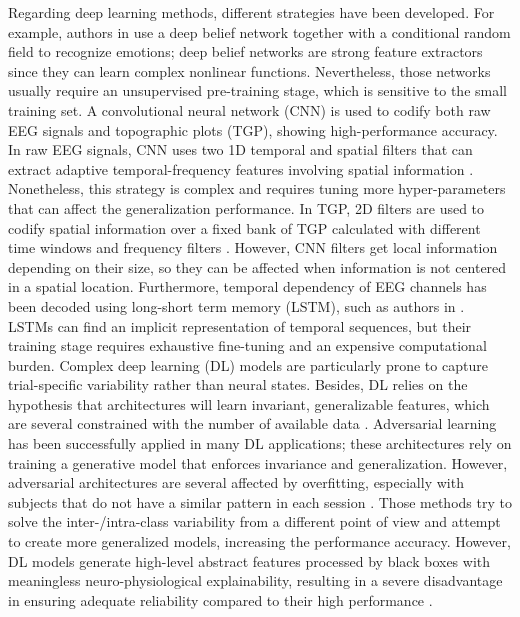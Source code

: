 Regarding deep learning methods, different strategies have been developed. For example, authors in \cite{chao2020emotion} use a deep belief network together with a conditional random field to recognize emotions; deep belief networks are strong feature extractors since they can learn complex nonlinear functions. Nevertheless, those networks usually require an unsupervised pre-training stage, which is sensitive to the small training set. A convolutional neural network (CNN) is used to codify both raw EEG signals and topographic plots (TGP), showing high-performance accuracy. In raw EEG signals, CNN uses two 1D temporal and spatial filters that can extract adaptive temporal-frequency features involving spatial information \cite{li2019channel}.
Nonetheless, this strategy is complex and requires tuning more hyper-parameters that can affect the generalization performance. In TGP, 2D filters are used to codify spatial information over a fixed bank of TGP calculated with different time windows and frequency filters \cite{pandey2021brain2depth}. However, CNN filters get local information depending on their size, so they can be affected when information is not centered in a spatial location. Furthermore, temporal dependency of EEG channels has been decoded using long-short term memory (LSTM), such as authors in \cite{tortora2020deep}. LSTMs can find an implicit representation of temporal sequences, but their training stage requires exhaustive fine-tuning and an expensive computational burden. Complex deep learning (DL) models are particularly prone to capture trial-specific variability rather than neural states. Besides, DL relies on the hypothesis that architectures will learn invariant, generalizable features, which are several constrained with the number of available data \cite{ozdenizci2019adversarial}. Adversarial learning has been successfully applied in many DL applications; these architectures rely on training a generative model that enforces invariance and generalization. However, adversarial architectures are several affected by overfitting, especially with subjects that do not have a similar pattern in each session \cite{ozdenizci2019adversarial}. Those methods try to solve the inter-/intra-class variability from a different point of view and attempt to create more generalized models, increasing the performance accuracy. However, DL models generate high-level
abstract features processed by black boxes with meaningless neuro-physiological explainability, resulting in a severe disadvantage in ensuring adequate reliability compared to their high performance \cite{bang2022interpretable}.

